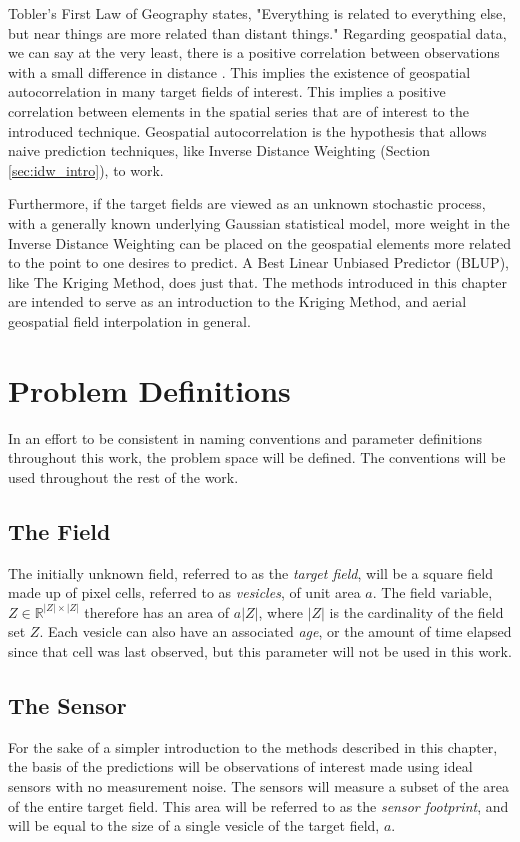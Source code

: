 \documentclass[11pt]{ucthesis}
\begin{document}
Tobler's First Law of Geography \cite{tobler:first_law} states, "Everything is related to everything else, but near things are more related than distant things." Regarding geospatial data, we can say at the very least, there is a positive correlation between observations with a small difference in distance \cite{miller:on_toblers_first_law}. This implies the existence of geospatial autocorrelation in many target fields of interest. This implies a positive correlation between elements in the spatial series that are of interest to the introduced technique. Geospatial autocorrelation is the hypothesis that allows naive prediction techniques, like Inverse Distance Weighting (Section \ref{sec:idw_intro}), to work. 

Furthermore, if the target fields are viewed as an unknown stochastic process, with a generally known underlying Gaussian statistical model, more weight in the Inverse Distance Weighting can be placed on the geospatial elements more related to the point to one desires to predict. A Best Linear Unbiased Predictor (BLUP), like The Kriging Method, does just that. The methods introduced in this chapter are intended to serve as an introduction to the Kriging Method, and aerial geospatial field interpolation in general.

\section{Problem Definitions} \label{sec:defs}
In an effort to be consistent in naming conventions and parameter definitions throughout this work, the problem space will be defined. The conventions will be used throughout the rest of the work.

\subsection{The Field}
The initially unknown field, referred to as the \textit{target field}, will be a square field made up of pixel cells, referred to as \textit{vesicles}, of unit area $a$. The field variable, $Z \in \mathbb{R}^{|Z| \times |Z|}$ therefore has an area of $a|Z|$, where $|Z|$ is the cardinality of the field set $Z$. Each vesicle can also have an associated \textit{age}, or the amount of time elapsed since that cell was last observed, but this parameter will not be used in this work.

\subsection{The Sensor}
For the sake of a simpler introduction to the methods described in this chapter, the basis of the predictions will be observations of interest made using ideal sensors with no measurement noise. The sensors will measure a subset of the area of the entire target field. This area will be referred to as the \textit{sensor footprint}, and will be equal to the size of a single vesicle of the target field, $a$.
\end{document}
